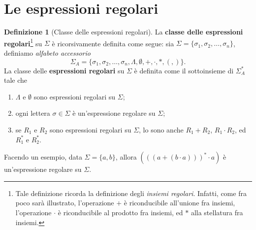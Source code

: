 \documentclass[10pt]{\classname}
\theoremstyle{definition}
\newtheorem{definizione}{Definizione}[section]
\theoremstyle{definition}
\begin{document}
\clearpage

\section{Le espressioni regolari}

\begin{definizione}[Classe delle espressioni regolari]
La \textbf{classe delle espressioni regolari}\footnote{Tale definizione ricorda
la definizione degli \emph{insiemi regolari}. Infatti, come fra poco sarà illustrato, l'operazione $+$ è
riconducibile all'unione fra insiemi, l'operazione $\cdot$ è riconducibile al
prodotto fra insiemi, ed $*$ alla stellatura fra insiemi.} su $\Sigma$ è
ricorsivamente definita come segue: sia $\Sigma = \{\sigma_1, \sigma_2, \dots,
\sigma_n\}$, definiamo \emph{alfabeto accessorio} $$\Sigma_A = \{\sigma_1,
\sigma_2, \dots, \sigma_n, \Lambda, \emptyset, +, \cdot, *, (, )\}.$$ La classe
delle \textbf{espressioni regolari} su $\Sigma$ è definita come il sottoinsieme
di $\Sigma_A^*$ tale che

\begin{enumerate}
    \item $\Lambda$ e $\emptyset$ sono espressioni regolari su $\Sigma$;
    \item ogni lettera $\sigma \in \Sigma$ è un'espressione regolare su
        $\Sigma$;
    \item se $R_1$ e $R_2$ sono espressioni regolari su $\Sigma$, lo sono anche
        $R_1 + R_2$, $R_1 \cdot R_2$, ed $R_1^*$ e $R_2^*$.
\end{enumerate}
\end{definizione}

Facendo un esempio, data $\Sigma = \{a,b\}$, allora $(((a + (b\cdot a)))^*\cdot
a)$ è un'espressione regolare su $\Sigma$.
\end{document}
